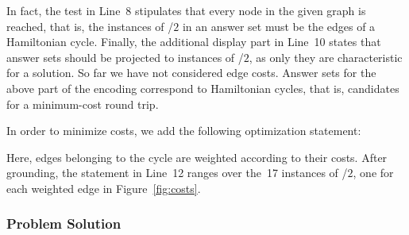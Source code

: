 In fact, the test in Line~8 stipulates that every node in the given graph
is reached, that is, the instances of /$2$ in an answer set
must be the edges of a Hamiltonian cycle.%
Finally, the additional display part in Line~10 states that answer sets should be projected to instances of /$2$,
as only they are characteristic for a solution.
So far we have not considered edge costs.
Answer sets for the above part of the encoding correspond to Hamiltonian cycles,
that is, candidates for a minimum-cost round trip.

In order to minimize costs,
we add the following optimization statement:
%

%
Here, edges belonging to the cycle are weighted according to their costs.
After grounding, the  statement in Line~12 ranges over the~17 instances of /$2$,
one for each weighted edge in Figure~\ref{fig:costs}.

\subsubsection{Problem Solution}\label{subsec:tsp:solution}


